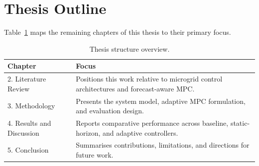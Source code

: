 \section{Thesis Outline}

Table~\ref{tab:outline} maps the remaining chapters of this thesis to their primary focus.

\begin{table}[htbp]
\centering
\caption{Thesis structure overview.}
\label{tab:outline}
\renewcommand{\arraystretch}{1.3}
\begin{tabularx}{\textwidth}{@{}l X@{}}
\toprule
\rowcolor{monashblue!10}
\textbf{Chapter} & \textbf{Focus} \\
\midrule
2. Literature Review & Positions this work relative to microgrid control architectures and forecast-aware MPC. \\
3. Methodology & Presents the system model, adaptive MPC formulation, and evaluation design. \\
4. Results and Discussion & Reports comparative performance across baseline, static-horizon, and adaptive controllers. \\
5. Conclusion & Summarises contributions, limitations, and directions for future work. \\
\bottomrule
\end{tabularx}
\end{table}

